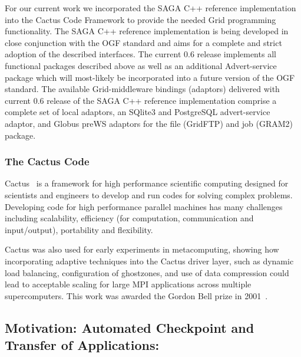 \documentclass[conference,final]{IEEEtran}
\begin{document}
{For our current work we incorporated the SAGA C++ reference
implementation~\cite{saga_web} into the Cactus Code Framework to
provide the needed Grid programming functionality. The SAGA C++
reference implementation is being developed in close conjunction with
the OGF standard and aims for a complete and strict adoption of the
described interfaces. The current 0.6 release implements all
functional packages described above as well as an additional
Advert-service package which will most-likely be incorporated into a
future version of the OGF standard.  The available Grid-middleware
bindings (adaptors) delivered with current 0.6 release of the SAGA C++
reference implementation comprise a complete set of local adaptors, an
SQlite3 and PostgreSQL advert-service adaptor, and Globus preWS
adaptors for the file (GridFTP) and job (GRAM2) package.


\subsubsection{The Cactus Code~\cite{cactus_web}}

Cactus~\cite{X0} is a framework for high performance scientific
computing designed for scientists and engineers to develop and run
codes for solving complex problems.  Developing code for high
performance parallel machines has many challenges including
scalability, efficiency (for computation, communication and
input/output), portability and flexibility. 

Cactus was also used for early experiments in metacomputing, showing
how incorporating adaptive techniques into the Cactus driver layer,
such as dynamic load balancing, configuration of ghostzones, and use
of data compression could lead to acceptable scaling for large MPI
applications across multiple supercomputers. This work was awarded the
Gordon Bell prize in 2001~\cite{Cactus_GordonBell}.

\subsection{Motivation: Automated Checkpoint and Transfer of
  Applications:}

}
\end{document}
